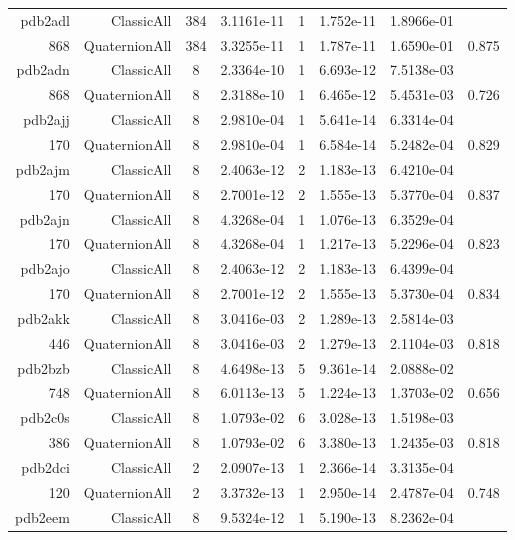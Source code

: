\begin{xltabular}{\textwidth}{r|rcS[table-format=1.4e+2]cS[table-format=1.3e+2]S[table-format=1.4e+2]S[table-format=-1.3]}
pdb2adl & ClassicAll & 384 & 3.1161e-11 & 1 & 1.752e-11 & 1.8966e-01 & \\
868 & QuaternionAll & 384 & 3.3255e-11 & 1 & 1.787e-11 & 1.6590e-01 & 0.875\\  \addlinespace
pdb2adn & ClassicAll & 8 & 2.3364e-10 & 1 & 6.693e-12 & 7.5138e-03 & \\
868 & QuaternionAll & 8 & 2.3188e-10 & 1 & 6.465e-12 & 5.4531e-03 & 0.726\\  \addlinespace
pdb2ajj & ClassicAll & 8 & 2.9810e-04 & 1 & 5.641e-14 & 6.3314e-04 & \\
170 & QuaternionAll & 8 & 2.9810e-04 & 1 & 6.584e-14 & 5.2482e-04 & 0.829\\  \addlinespace
pdb2ajm & ClassicAll & 8 & 2.4063e-12 & 2 & 1.183e-13 & 6.4210e-04 & \\
170 & QuaternionAll & 8 & 2.7001e-12 & 2 & 1.555e-13 & 5.3770e-04 & 0.837\\  \addlinespace
pdb2ajn & ClassicAll & 8 & 4.3268e-04 & 1 & 1.076e-13 & 6.3529e-04 & \\
170 & QuaternionAll & 8 & 4.3268e-04 & 1 & 1.217e-13 & 5.2296e-04 & 0.823\\  \addlinespace
pdb2ajo & ClassicAll & 8 & 2.4063e-12 & 2 & 1.183e-13 & 6.4399e-04 & \\
170 & QuaternionAll & 8 & 2.7001e-12 & 2 & 1.555e-13 & 5.3730e-04 & 0.834\\  \addlinespace
pdb2akk & ClassicAll & 8 & 3.0416e-03 & 2 & 1.289e-13 & 2.5814e-03 & \\
446 & QuaternionAll & 8 & 3.0416e-03 & 2 & 1.279e-13 & 2.1104e-03 & 0.818\\  \addlinespace
pdb2bzb & ClassicAll & 8 & 4.6498e-13 & 5 & 9.361e-14 & 2.0888e-02 & \\
748 & QuaternionAll & 8 & 6.0113e-13 & 5 & 1.224e-13 & 1.3703e-02 & 0.656\\  \addlinespace
pdb2c0s & ClassicAll & 8 & 1.0793e-02 & 6 & 3.028e-13 & 1.5198e-03 & \\
386 & QuaternionAll & 8 & 1.0793e-02 & 6 & 3.380e-13 & 1.2435e-03 & 0.818\\  \addlinespace
pdb2dci & ClassicAll & 2 & 2.0907e-13 & 1 & 2.366e-14 & 3.3135e-04 & \\
120 & QuaternionAll & 2 & 3.3732e-13 & 1 & 2.950e-14 & 2.4787e-04 & 0.748\\  \addlinespace
pdb2eem & ClassicAll & 8 & 9.5324e-12 & 1 & 5.190e-13 & 8.2362e-04 & \\

\end{xltabular}
